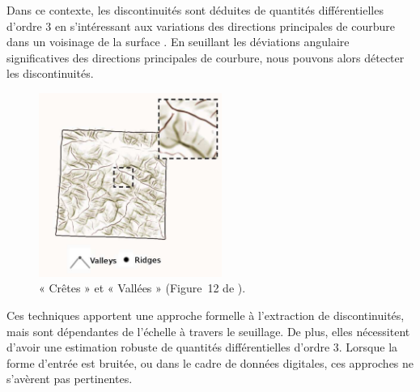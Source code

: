 %
Dans ce contexte, les discontinuités sont déduites de quantités différentielles
d'ordre $3$ en s'intéressant aux variations des directions principales de
courbure dans un voisinage de la surface \cite{Lai2007,Yang2006}. En seuillant
les déviations angulaire significatives des directions principales de courbure,
nous pouvons alors détecter les discontinuités.
%
\begin{figure}[ht]{
    \begin{center}
    \includegraphics[height=6cm]{images/Feature/RidgesValleys}
    \end{center}}
    \caption[Notations.]{« Crêtes » et « Vallées » (Figure~12 de \cite{Vergne2011}).
      \label{fig:ridges-valleys}}
\end{figure}
%
Ces techniques apportent une approche formelle à l'extraction de discontinuités,
mais sont dépendantes de l'échelle à travers le seuillage. De plus, elles
nécessitent d'avoir une estimation robuste de quantités différentielles d'ordre
$3$. Lorsque la forme d'entrée est bruitée, ou dans le cadre de données
digitales, ces approches ne s'avèrent pas pertinentes.
%
%
%
